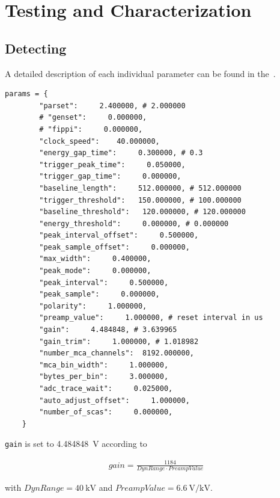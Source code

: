 \chapter{Testing and Characterization}
    \section{Detecting}
        A detailed description of each individual parameter can be found in the~\cite{Manual.HandelAPIManual.Xiang,Manual.HandelProgrammersGuideMicroDXP.Xiang,Software.HandelRelease.2023}.

        \begin{lstlisting}[style=mypython,
            caption={[]Detector settings taken from the technical specifications report coming with the detector. If not stated otherwise the value stored on the device was used.},
            label={lst:default detection parameters}]
    params = {
        "parset":     2.400000, # 2.000000
        # "genset":     0.000000,
        # "fippi":     0.000000,
        "clock_speed":    40.000000,
        "energy_gap_time":     0.300000, # 0.3
        "trigger_peak_time":     0.050000,
        "trigger_gap_time":     0.000000,
        "baseline_length":     512.000000, # 512.000000
        "trigger_threshold":   150.000000, # 100.000000
        "baseline_threshold":   120.000000, # 120.000000
        "energy_threshold":     0.000000, # 0.000000
        "peak_interval_offset":     0.500000,
        "peak_sample_offset":     0.000000,
        "max_width":     0.400000,
        "peak_mode":     0.000000,
        "peak_interval":     0.500000,
        "peak_sample":     0.000000,
        "polarity":     1.000000,
        "preamp_value":     1.000000, # reset interval in us
        "gain":     4.484848, # 3.639965
        "gain_trim":     1.000000, # 1.018982
        "number_mca_channels":  8192.000000,
        "mca_bin_width":     1.000000,
        "bytes_per_bin":     3.000000,
        "adc_trace_wait":     0.025000,
        "auto_adjust_offset":     1.000000,
        "number_of_scas":     0.000000,
    }
        \end{lstlisting}

        \texttt{gain} is set to \qty{4.484848}{\volt} according to

        \begin{align}
            gain = \frac{1184}{DynRange \cdot PreampValue}
        \end{align}

        with \(DynRange = \qty{40}{\kV}\) and \(PreampValue = \qty{6.6}{\volt\per\kV}\).

